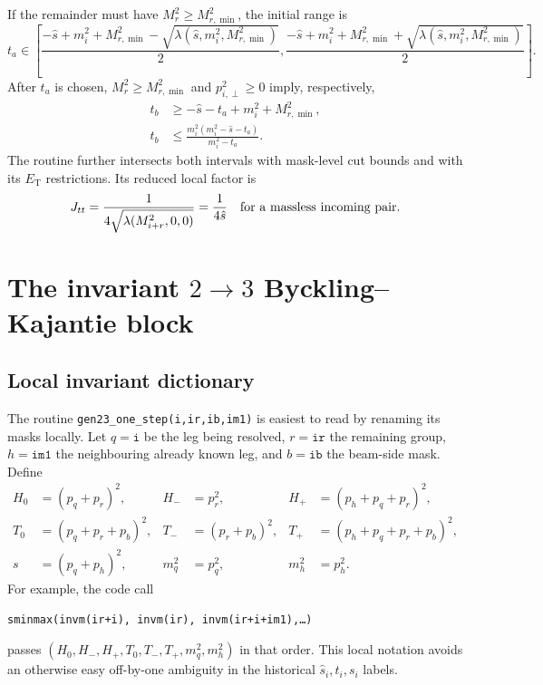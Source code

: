 \documentclass[11pt,a4paper]{article}
\newcommand{\shat}{\hat{s}}
\newcommand{\code}[1]{\texttt{#1}}
\newcommand{\lam}{\lambda}
\newcommand{\ET}{E_{\mathrm{T}}}
\begin{document}
If the remainder must have $M_r^2\geq M_{r,\min}^2$, the initial range is
\begin{equation}
 t_a\in\left[
 \frac{-\shat+m_i^2+M_{r,\min}^2-
 \sqrt{\lam(\shat,m_i^2,M_{r,\min}^2)}}{2},
 \frac{-\shat+m_i^2+M_{r,\min}^2+
 \sqrt{\lam(\shat,m_i^2,M_{r,\min}^2)}}{2}\right].
 \label{eq:doubletfirstbound}
\end{equation}
After $t_a$ is chosen, $M_r^2\geq M_{r,\min}^2$ and
$p_{i,\perp}^2\geq0$ imply, respectively,
\begin{align}
 t_b&\geq-\shat-t_a+m_i^2+M_{r,\min}^2,\\
 t_b&\leq \frac{m_i^2(m_i^2-\shat-t_a)}{m_i^2-t_a} .
 \label{eq:doubletsecondbound}
\end{align}
The routine further intersects both intervals with mask-level cut bounds and
with its $\ET$ restrictions.  Its reduced local factor is
\begin{equation}
 J_{tt}=\frac{1}{4\sqrt{\lam(M_{i+r}^2,0,0)}}=
 \frac{1}{4\shat}
 \quad\hbox{for a massless incoming pair.}
 \label{eq:doubletjac}
\end{equation}

\section{The invariant $2\to3$ Byckling--Kajantie block}

\subsection{Local invariant dictionary}

The routine \code{gen23\_one\_step(i,ir,ib,im1)} is easiest to read by
renaming its masks locally.  Let $q=\code{i}$ be the leg being resolved,
$r=\code{ir}$ the remaining group, $h=\code{im1}$ the neighbouring already
known leg, and $b=\code{ib}$ the beam-side mask.  Define
\begin{align}
 H_0&=(p_q+p_r)^2,& H_-&=p_r^2,& H_+&=(p_h+p_q+p_r)^2,\\
 T_0&=(p_q+p_r+p_b)^2,& T_-&=(p_r+p_b)^2,&
 T_+&=(p_h+p_q+p_r+p_b)^2,\\
 s&=(p_q+p_h)^2,& m_q^2&=p_q^2,&m_h^2&=p_h^2 .
 \label{eq:bkdictionary}
\end{align}
For example, the code call
\begin{center}
\code{sminmax(invm(ir+i), invm(ir), invm(ir+i+im1),\ldots)}
\end{center}
passes $(H_0,H_-,H_+,T_0,T_-,T_+,m_q^2,m_h^2)$ in that order.  This local
notation avoids an otherwise easy off-by-one ambiguity in the historical
$\hat s_i,t_i,s_i$ labels.
\end{document}
